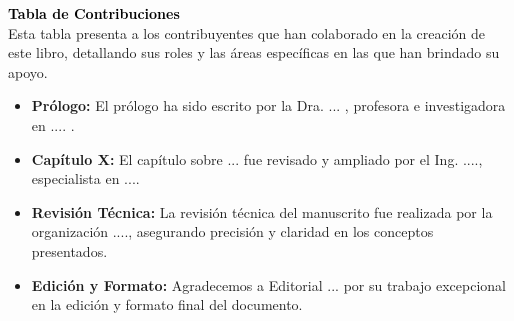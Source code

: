 \thispagestyle{empty}
\vspace*{2cm}
\textcolor{black}{\Huge \textbf{Tabla de Contribuciones}} \\[0.7cm] %

Esta tabla presenta a los contribuyentes que han colaborado en la creación de este libro,
detallando sus roles y las áreas específicas en las que han brindado su apoyo.

\begin{itemize}
    \item \textbf{Prólogo:}  
    El prólogo ha sido escrito por la Dra. ... , profesora e investigadora en .... .
    
    \item \textbf{Capítulo X:}  
    El capítulo sobre ... fue revisado y ampliado por el Ing. ...., especialista en .... 

    \item \textbf{Revisión Técnica:}  
    La revisión técnica del manuscrito fue realizada por la organización ...., asegurando precisión y claridad en los conceptos presentados.

    \item \textbf{Edición y Formato:}  
    Agradecemos a Editorial ... por su trabajo excepcional en la edición y formato final del documento.
\end{itemize}
\clearpage
